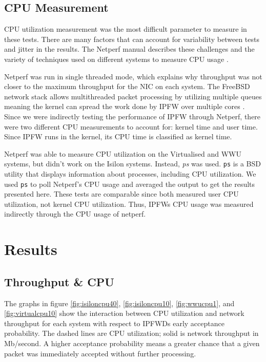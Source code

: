 \documentclass[journal]{IEEEtran}
\begin{document}
  \subsection{CPU Measurement}

    CPU utilization measurement was the most difficult parameter to measure in
    these tests. There are many factors that can account for variability
    between tests and jitter in the results. The Netperf manual describes these
    challenges and the variety of techniques used on different systems to
    measure CPU usage \cite{netperf}.

    Netperf was run in single threaded mode, which explains why throughput was
    not closer to the maximum throughput for the NIC on each system. The
    FreeBSD network stack allows multithreaded packet processing by utilizing
    multiple queues meaning the kernel can spread the work done by IPFW over
    multiple cores \cite{freebsdhandbook}. Since we were indirectly testing the
    performance of IPFW through Netperf, there were two different CPU
    measurements to account for: kernel time and user time. Since IPFW runs in
    the kernel, its CPU time is classified as kernel time.

    Netperf was able to measure CPU utilization on the Virtualised and WWU
    systems, but didn't work on the Isilon systems. Instead, \textit{ps} was
    used. \texttt{ps} is a BSD utility that displays information about
    processes, including CPU utilization. We used \texttt{ps} to poll Netperf's
    CPU usage and averaged the output to get the results presented here. These
    tests are comparable since both measured user CPU utilization, not kernel
    CPU utilization. Thus, IPFWs CPU usage was measured indirectly through the
    CPU usage of netperf.


\section{Results}
  
  \subsection{Throughput \& CPU}

    The graphs in figure \ref{fig:isiloncpu40}, \ref{fig:isiloncpu10},
    \ref{fig:wwucpu1}, and \ref{fig:virtualcpu10} show the interaction between
    CPU utilization and network throughput for each system with respect to
    IPFWDs early acceptance probability. The dashed lines are CPU utilization;
    solid is network throughput in Mb/second. A higher acceptance probability
    means a greater chance that a given packet was immediately accepted without
    further processing.
\end{document}
